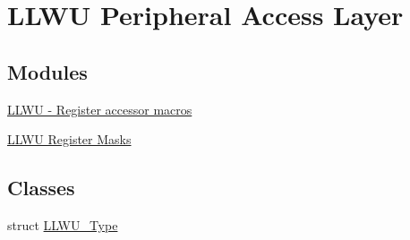 \hypertarget{group__LLWU__Peripheral__Access__Layer}{}\section{L\+L\+WU Peripheral Access Layer}
\label{group__LLWU__Peripheral__Access__Layer}
\subsection*{Modules}
\begin{DoxyCompactItemize}
\item 
\hyperlink{group__LLWU__Register__Accessor__Macros}{L\+L\+W\+U -\/ Register accessor macros}
\item 
\hyperlink{group__LLWU__Register__Masks}{L\+L\+W\+U Register Masks}
\end{DoxyCompactItemize}
\subsection*{Classes}
\begin{DoxyCompactItemize}
\item 
struct \hyperlink{structLLWU__Type}{L\+L\+W\+U\+\_\+\+Type}
\end{DoxyCompactItemize}
